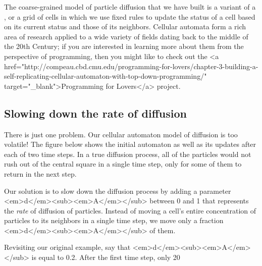 {The coarse-grained model of particle diffusion that we have built is a variant of a , or a grid of cells in which we use fixed rules to update the status of a cell based on its current status and those of its neighbors. Cellular automata form a rich area of research applied to a wide variety of fields dating back to the middle of the 20th Century; if you are interested in learning more about them from the perspective of programming, then you might like to check out the <a href="http://compeau.cbd.cmu.edu/programming-for-lovers/chapter-3-building-a-self-replicating-cellular-automaton-with-top-down-programming/" target="_blank">Programming for Lovers</a> project.

\FloatBarrier
{}
\subsection{Slowing down the rate of diffusion}

There is just one problem. Our cellular automaton model of diffusion is too volatile! The figure below shows the initial automaton as well as its updates after each of two time steps. In a true diffusion process, all of the particles would not rush out of the central square in a single time step, only for some of them to return in the next step.

{%

Our solution is to slow down the diffusion process by adding a parameter <em>d</em><sub><em>A</em></sub> between 0 and 1 that represents the \textit{rate} of diffusion of  particles. Instead of moving a cell's entire concentration of particles to its neighbors in a single time step, we move only a fraction <em>d</em><sub><em>A</em></sub> of them.

Revisiting our original example, say that <em>d</em><sub><em>A</em></sub> is equal to 0.2. After the first time step, only 20%

}}
